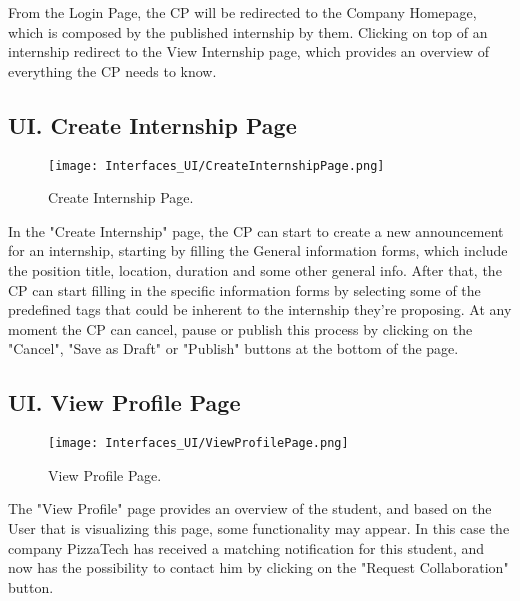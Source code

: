 From the Login Page, the CP will be redirected to the Company Homepage, which is composed by the published internship by them. Clicking on top of an internship redirect to the View Internship page, which provides an overview of everything the CP needs to know.

\subsection*{UI\cui . Create Internship Page}

\begin{figure}[H]
    \begin{center}
        \texttt{[image: Interfaces\_UI/CreateInternshipPage.png]}
        \caption{Create Internship Page.}
        \label{fig:create_internship_page}%
    \end{center}   
\end{figure}

In the "Create Internship" page, the CP can start to create a new announcement for an internship, starting by filling the General information forms, which include the position title, location, duration and some other general info.
After that, the CP can start filling in the specific information forms by selecting some of the predefined tags that could be inherent to the internship they're proposing. At any moment the CP can cancel, pause or publish this process by clicking on the "Cancel", "Save as Draft" or "Publish" buttons at the bottom of the page.

\subsection*{UI\cui . View Profile Page}

\begin{figure}[H]
    \begin{center}
        \texttt{[image: Interfaces\_UI/ViewProfilePage.png]}
        \caption{View Profile Page.}
        \label{fig:view_profile_page}%
    \end{center}
\end{figure}

The "View Profile" page provides an overview of the student, and based on the User that is visualizing this page, some functionality may appear. In this case the company PizzaTech has received a matching notification for this student, and now has the possibility to contact him by clicking on the "Request Collaboration" button.

